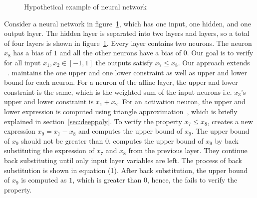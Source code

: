 \begin{figure}[t]
	\centering
	\scalebox{0.8}{}
	\caption{Hypothetical example of neural network}
	\label{fig:motivating}
\end{figure}
Consider a neural network in figure~\ref{fig:motivating},  which has one input, one hidden, and one output layer. The hidden layer is separated into two layers 
\affine{} and \relu{} layers, so a total of four layers is shown in figure~\ref{fig:motivating}. 
Every layer contains two neurons. The neuron $x_8$ has a bias of $1$ and all the other neurons have a bias of $0$. 
Our goal is to verify for all input $x_1,x_2 \in [-1,1]$ the outputs satisfy $x_7 \leq x_8$. 
Our approach extends \deeppoly{}~\cite{singh2019abstract}. \deeppoly{} maintains the one upper and one lower constraint
as well as upper and lower bound for each neuron. For a neuron of the affine layer, the upper and lower constraint is 
the same, which is the weighted sum of the input neurons i.e. $x_3$'s upper and lower constraint is $x_1+x_2$.
For an activation neuron, the upper and lower expression is computed using triangle approximation~\cite{singh2019abstract}, 
which is briefly explained in section~\ref{sec:deeppoly}. To verify the property $x_7 \leq x_8$, \deeppoly{} creates a 
new expression $x_9 = x_7 - x_8$ and computes the upper bound of $x_9$. The upper bound of $x_9$ should not be greater
than $0$. \deeppoly{} computes the upper bound of $x_9$ by back substituting the expression of $x_7$ and $x_8$ 
from the previous layer.%
They continue back substituting until only input layer variables are left.
The process of back substitution is shown in equation (1). %
After back substitution, the upper bound of $x_9$ is
computed as $1$, which is greater than $0$, 
hence, the \deeppoly{} fails to verify the property.

